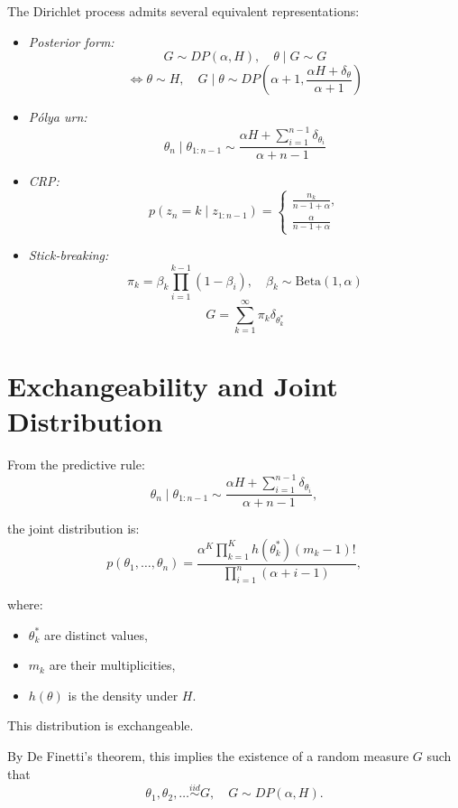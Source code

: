 \documentclass[12pt,oneside]{book}
\numberwithin{equation}{section}
\theoremstyle{definition}
\theoremstyle{plain}
\theoremstyle{remark}
\begin{document}
The Dirichlet process admits several equivalent representations:

\begin{itemize}
\item \emph{Posterior form:}
\[
G \sim DP(\alpha,H), \quad \theta \mid G \sim G
\]
\[
\Longleftrightarrow
\theta \sim H,\quad
G \mid \theta \sim DP\left(\alpha+1, \frac{\alpha H + \delta_\theta}{\alpha+1}\right)
\]

\item \emph{Pólya urn:}
\[
\theta_n \mid \theta_{1:n-1}
\sim
\frac{\alpha H + \sum_{i=1}^{n-1} \delta_{\theta_i}}{\alpha+n-1}
\]

\item \emph{CRP:}
\[
p(z_n = k \mid z_{1:n-1}) =
\begin{cases}
\frac{n_k}{n-1+\alpha}, \\
\frac{\alpha}{n-1+\alpha}
\end{cases}
\]

\item \emph{Stick-breaking:}
\[
\pi_k = \beta_k \prod_{i=1}^{k-1}(1-\beta_i),\quad
\beta_k \sim \mathrm{Beta}(1,\alpha)
\]
\[
G = \sum_{k=1}^{\infty} \pi_k \delta_{\theta_k^*}
\]
\end{itemize}

\section*{Exchangeability and Joint Distribution}

From the predictive rule:
\[
\theta_n \mid \theta_{1:n-1}
\sim
\frac{\alpha H + \sum_{i=1}^{n-1} \delta_{\theta_i}}{\alpha+n-1},
\]

the joint distribution is:
\[
p(\theta_1,\dots,\theta_n)
=
\frac{\alpha^K \prod_{k=1}^K h(\theta_k^*) (m_k-1)!}{\prod_{i=1}^n (\alpha + i - 1)},
\]

where:
\begin{itemize}
\item $\theta_k^*$ are distinct values,
\item $m_k$ are their multiplicities,
\item $h(\theta)$ is the density under $H$.
\end{itemize}

This distribution is exchangeable.

By De Finetti’s theorem, this implies the existence of a random measure $G$ such that
\[
\theta_1,\theta_2,\dots \overset{iid}{\sim} G,
\quad G \sim DP(\alpha,H).
\]
\end{document}
